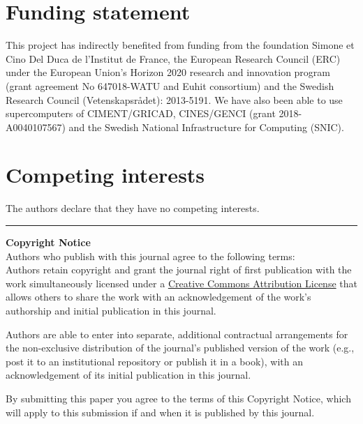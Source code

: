 \documentclass{../jors}
\begin{document}
\section*{Funding statement}


This project has indirectly benefited from funding from the foundation Simone et
Cino Del Duca de l'Institut de France, the European Research Council (ERC)
under the European Union's Horizon 2020 research and innovation program (grant
agreement No 647018-WATU and Euhit consortium) and the Swedish Research Council
(Vetenskapsr{\aa}det): 2013-5191.
%
We have also been able to use supercomputers of CIMENT/GRICAD, CINES/GENCI
(grant 2018-A0040107567) and the Swedish National Infrastructure for Computing
(SNIC).

\section*{Competing interests}

The authors declare that they have no competing interests.


%





\rule{\textwidth}{1pt}

{\bf Copyright Notice} \\
Authors who publish with this journal agree to the following terms: \\

Authors retain copyright and grant the journal right of first publication with
the work simultaneously licensed under a
\href{http://creativecommons.org/licenses/by/3.0/}{Creative Commons Attribution
License} that allows others to share the work with an acknowledgement of the
work's authorship and initial publication in this journal.

Authors are able to enter into separate, additional contractual arrangements
for the non-exclusive distribution of the journal's published version of the
work (e.g., post it to an institutional repository or publish it in a book),
with an acknowledgement of its initial publication in this journal.

By submitting this paper you agree to the terms of this Copyright Notice, which
will apply to this submission if and when it is published by this journal.
\end{document}
